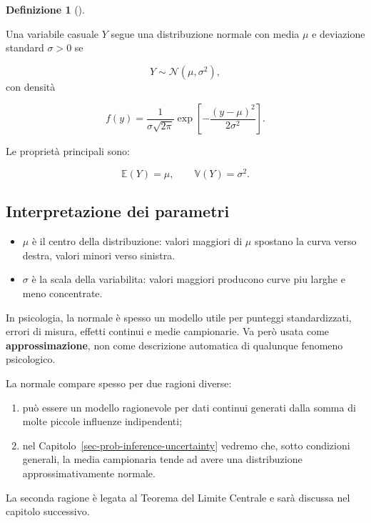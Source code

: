 \documentclass[
  italian,
  letterpaper,
  a4paper,
  11pt,
  open=any]{scrbook}
\providecommand{\tightlist}{%
  \setlength{\itemsep}{0pt}\setlength{\parskip}{0pt}}
\theoremstyle{plain}
\theoremstyle{definition}
\theoremstyle{definition}
\newtheorem{definition}{Definizione}[chapter]
\theoremstyle{remark}
\begin{document}
\begin{definition}[]\protect\hypertarget{def-normal}{}\label{def-normal}

Una variabile casuale \(Y\) segue una distribuzione normale con media
\(\mu\) e deviazione standard \(\sigma > 0\) se

\[
Y \sim \mathcal{N}(\mu,\sigma^2),
\] con densità

\[
f(y) = \frac{1}{\sigma\sqrt{2\pi}}
\exp\left[-\frac{(y-\mu)^2}{2\sigma^2}\right].
\]

Le proprietà principali sono:

\[
\mathbb{E}(Y)=\mu,
\qquad
\mathbb{V}(Y)=\sigma^2.
\]

\end{definition}

\subsection{Interpretazione dei
parametri}\label{interpretazione-dei-parametri}

\begin{itemize}
\tightlist
\item
  \(\mu\) è il centro della distribuzione: valori maggiori di \(\mu\)
  spostano la curva verso destra, valori minori verso sinistra.
\item
  \(\sigma\) è la scala della variabilita: valori maggiori producono
  curve piu larghe e meno concentrate.
\end{itemize}

In psicologia, la normale è spesso un modello utile per punteggi
standardizzati, errori di misura, effetti continui e medie campionarie.
Va però usata come \textbf{approssimazione}, non come descrizione
automatica di qualunque fenomeno psicologico.

\begin{tcolorbox}[enhanced jigsaw, arc=.35mm, bottomrule=.15mm, bottomtitle=1mm, breakable, colback=white, colbacktitle=quarto-callout-note-color!10!white, colframe=quarto-callout-note-color-frame, coltitle=black, left=2mm, leftrule=.75mm, opacityback=0, opacitybacktitle=0.6, rightrule=.15mm, title=\textcolor{quarto-callout-note-color}{\faInfo}\hspace{0.5em}{Perche la normale e cosi importante?}, titlerule=0mm, toprule=.15mm, toptitle=1mm]

La normale compare spesso per due ragioni diverse:

\begin{enumerate}
\def\labelenumi{\arabic{enumi}.}
\tightlist
\item
  può essere un modello ragionevole per dati continui generati dalla
  somma di molte piccole influenze indipendenti;
\item
  nel Capitolo~\ref{sec-prob-inference-uncertainty} vedremo che, sotto
  condizioni generali, la media campionaria tende ad avere una
  distribuzione approssimativamente normale.
\end{enumerate}

La seconda ragione è legata al Teorema del Limite Centrale e sarà
discussa nel capitolo successivo.

\end{tcolorbox}
\end{document}
